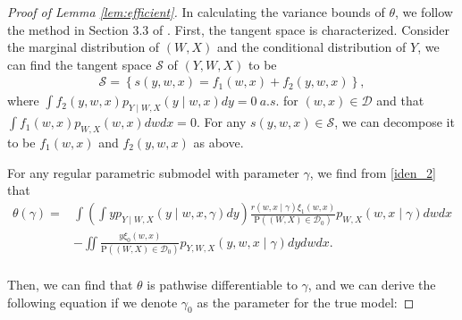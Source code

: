 \documentclass[11pt]{article}
\def\P{{\mathrm P}}
\numberwithin{equation}{section}
\theoremstyle{definition}
\begin{document}
\begin{proof}[Proof of Lemma \ref{lem:efficient}]
In calculating the variance bounds of $\theta$, we follow the method in Section 3.3 of \cite{bickel1982adaptive}. First, the tangent space is characterized. Consider the marginal distribution of $(W,X)$ and the conditional distribution of $Y$, we can find the tangent space $\mathscr{S}$ of $(Y,W,X)$ to be
\begin{align*}
\mathscr{S}=\left\{s(y,w,x)=f_1(w,x)+f_2(y,w,x)\right\},
\end{align*}
where $\int f_{2}(y,w, x) p_{Y\mid W,X}(y \mid w,x) d y=0\ a.s.$ for $(w,x)\in\mathcal{D}$ and that $\int f_{1}(w,x) p_{W,X}(w,x) dwdx=0$. For any $s(y,w,x)\in\mathcal{S}$, we can decompose it to be $f_1(w,x)$ and $f_2(y,w,x)$ as above.

For any regular parametric submodel with parameter $\gamma$, we find from \eqref{iden_2} that
\begin{align*}
\theta(\gamma)=&\int\left(\int yp_{Y\mid W,X}(y\mid w,x,\gamma)dy\right)\frac{r(w,x\mid \gamma)\xi_1(w,x)}{\P((W,X)\in\mathcal{D}_0)}p_{W,X}(w,x\mid\gamma)dwdx\\
&-\iint\frac{y\xi_0(w,x)}{\P((W,X)\in\mathcal{D}_0)} p_{Y,W,X}(y,w,x\mid\gamma) dydwdx.\\
\end{align*}


Then, we can find that $\theta$ is pathwise differentiable to $\gamma$, and we can derive the following equation if we denote $\gamma_0$ as the parameter for the true model:


\end{proof}
\end{document}
